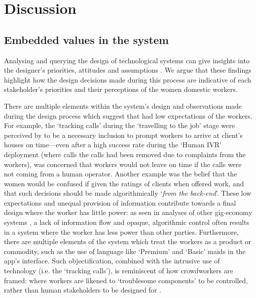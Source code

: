 \section{Discussion}

\subsection{Embedded values in the system}

Analysing and querying the design of technological systems can give insights into the designer's priorities, attitudes and assumptions \citep{Star1999}. We argue that these findings highlight how the design decisions made during this process are indicative of each stakeholder's priorities and their perceptions of the women domestic workers.

There are multiple elements within the system's design and observations made during the design process which suggest that \PC{} had low expectations of the workers. For example, the `tracking calls' during the `travelling to the job' stage were perceived by \PC{} to be a necessary inclusion to prompt workers to arrive at client's houses on time---even after a high success rate during the `Human IVR' deployment (where calls the calls had been removed due to complaints from the workers), \PCTwo{} was concerned that workers would not leave on time if the calls were not coming from a human operator. Another example was the belief that the women would be confused if given the ratings of clients when offered work, and that such decisions should be made algorithmically `\textit{from the back-end}'. These low expectations and unequal provision of information contribute towards a final design where the worker has little power: as seen in analyses of other gig-economy systems \cite{martin2016, Hara2018, carlos2021, lee2015}, a lack of information flow and opaque, algorithmic control often results in a system where the worker has less power than other parties. Furthermore, there are multiple elements of the system which treat the workers as a product or commodity, such as the use of language like `Premium' and `Basic' maids in the app's interface. Such objectification, combined with the intrusive use of technology (i.e. the `tracking calls'), is reminiscent of how crowdworkers are framed: where workers are likened to `troublesome components' to be controlled, rather than human stakeholders to be designed for \cite{martin2016}.

